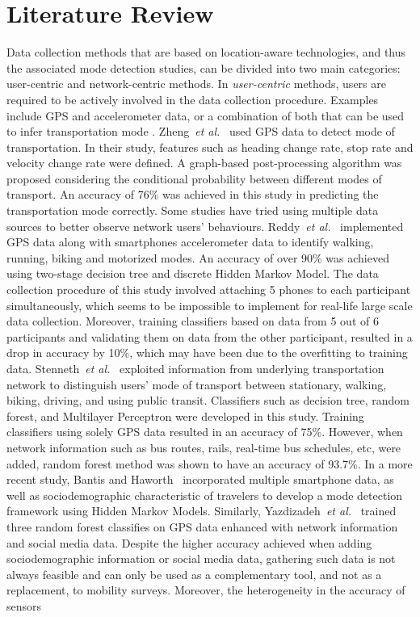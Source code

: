 \section{Literature Review}
\label{S:w2}
Data collection methods that are based on location-aware technologies, and thus the associated mode detection studies, can be divided into two main categories: user-centric and network-centric methods. In \emph{user-centric} methods, users are required to be actively involved in the data collection procedure. Examples include GPS and accelerometer data, or a combination of both that can be used to infer transportation mode \cite{zheng2008understanding,reddy2008determining,stenneth2011transportation,endo2016deep,xiao2017identifying,dabiri2018inferring,efthymiou2019transportation}. 
Zheng~\textit{et al.}~\cite{zheng2008understanding} used GPS data to detect mode of transportation. In their study, features such as heading change rate, stop rate and velocity change rate were defined. A graph-based post-processing algorithm was proposed considering the conditional probability between different modes of transport. An accuracy of 76\% was achieved in this study in predicting the transportation mode correctly. Some studies have tried using multiple data sources to better observe network users' behaviours. Reddy~\textit{et al.}~\cite{reddy2008determining} implemented GPS data along with smartphones accelerometer data to identify walking, running, biking and motorized modes. An accuracy of over 90\% was achieved using two-stage decision tree and discrete Hidden Markov Model. The data collection procedure of this study involved attaching 5 phones to each participant simultaneously, which seems to be impossible to implement for real-life large scale data collection. Moreover, training classifiers based on data from 5 out of 6 participants and validating them on data from the other participant, resulted in a drop in accuracy by 10\%, which may have been due to the overfitting to training data. Stenneth~\textit{et al.}~\cite{stenneth2011transportation} exploited information from underlying transportation network to distinguish users' mode of transport between stationary, walking, biking, driving, and using public transit. Classifiers such as decision tree, random forest, and Multilayer Perceptron were developed in this study. Training classifiers using solely GPS data resulted in an accuracy of 75\%. However, when network information such as bus routes, rails, real-time bus schedules, etc, were added, random forest method was shown to have an accuracy of 93.7\%. In a more recent study, Bantis and Haworth~\cite{bantis2017you} incorporated multiple smartphone data, as well as sociodemographic characteristic of travelers to develop a mode detection framework using Hidden Markov Models. Similarly, Yazdizadeh~\textit{et al.}~\cite{yazdizadeh2019automated} trained three random forest classifies on GPS data enhanced with network information and social media data. Despite the higher accuracy achieved when adding sociodemographic information or social media data, gathering such data is not always feasible and can only be used as a complementary tool, and not as a replacement, to mobility surveys. Moreover, the heterogeneity in the accuracy of sensors 